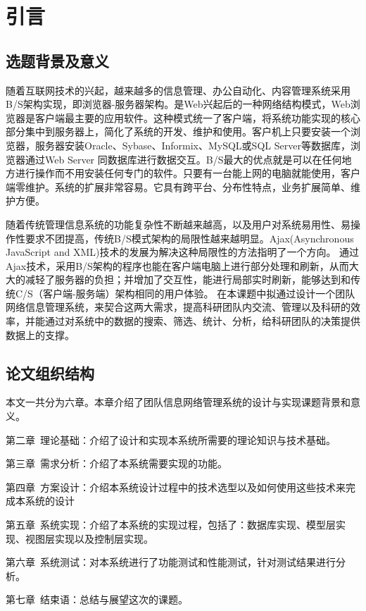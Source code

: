 
\chapter{引言}
\section{选题背景及意义}
随着互联网技术的兴起，越来越多的信息管理、办公自动化、内容管理系统采用B/S架构实现，即浏览器-服务器架构。是Web兴起后的一种网络结构模式，Web浏览器是客户端最主要的应用软件。这种模式统一了客户端，将系统功能实现的核心部分集中到服务器上，简化了系统的开发、维护和使用。客户机上只要安装一个浏览器，服务器安装Oracle、Sybase、Informix、MySQL或SQL Server等数据库，浏览器通过Web Server 同数据库进行数据交互。B/S最大的优点就是可以在任何地方进行操作而不用安装任何专门的软件。只要有一台能上网的电脑就能使用，客户端零维护。系统的扩展非常容易。它具有跨平台、分布性特点，业务扩展简单、维护方便。

随着传统管理信息系统的功能复杂性不断越来越高，以及用户对系统易用性、易操作性要求不团提高，传统B/S模式架构的局限性越来越明显。Ajax(Asynchronous JavaScript and XML)技术的发展为解决这种局限性的方法指明了一个方向。
通过Ajax技术，采用B/S架构的程序也能在客户端电脑上进行部分处理和刷新，从而大大的减轻了服务器的负担；并增加了交互性，能进行局部实时刷新，能够达到和传统C/S（客户端-服务端）架构相同的用户体验。
在本课题中拟通过设计一个团队网络信息管理系统，来契合这两大需求，提高科研团队内交流、管理以及科研的效率，并能通过对系统中的数据的搜索、筛选、统计、分析，给科研团队的决策提供数据上的支撑。

\section{论文组织结构}

本文一共分为六章。本章介绍了团队信息网络管理系统的设计与实现课题背景和意义。

第二章~理论基础：介绍了设计和实现本系统所需要的理论知识与技术基础。

第三章~需求分析：介绍了本系统需要实现的功能。

第四章~方案设计：介绍本系统设计过程中的技术选型以及如何使用这些技术来完成本系统的设计

第五章~系统实现：介绍了本系统的实现过程，包括了：数据库实现、模型层实现、视图层实现以及控制层实现。

第六章~系统测试：对本系统进行了功能测试和性能测试，针对测试结果进行分析。

第七章~结束语：总结与展望这次的课题。
